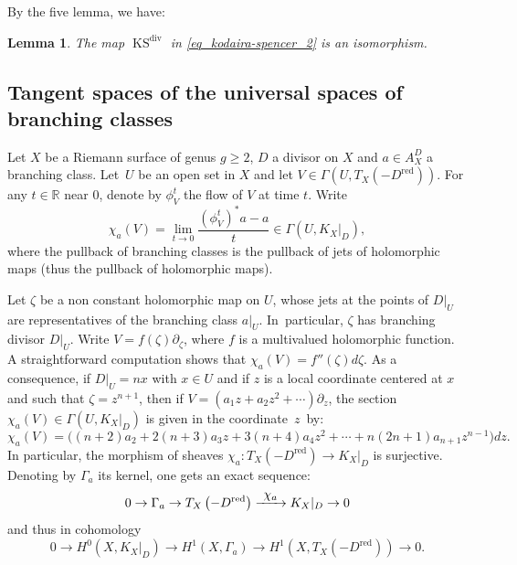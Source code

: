 \documentclass[JEP,XML,SOM,Unicode,NoEqCountersInSection,published]{cedram}
\newcommand\To[1]{\mathchoice{\xrightarrow{\textstyle\kern4pt#1\kern3pt}}{\stackrel{#1}{\longrightarrow}}{}{}}
\newcommand{\red}{\mathrm{red}}
\DeclareMathOperator{\Div}{div}
\DeclareMathOperator{\KS}{KS}
\theoremstyle{definition}
\theoremstyle{plain}
\newtheorem{lemma}[definition]{Lemma}
\begin{document}
By the five lemma, we have:

\begin{lemma}\label{lemma_KS'_iso}
The map $\KS^{\Div}$ in \eqref{eq_kodaira-spencer_2} is an isomorphism.
\end{lemma}

\subsection{Tangent spaces of the universal spaces of branching classes}\label{subsection_tangent_spaces_univ_spaces_bc}

Let $X$ be a Riemann surface of genus $g \ge 2$, $D$ a divisor on $X$ and $a \in A_X^D$ a branching class.
Let~$U$ be an open set in $X$ and let $V \in\Gamma(U, T_X(-D^{\red}))$.
For any $t \in \mathbb R$ near $0$, denote by $\phi^t_V$ the flow of $V$ at time $t$.
Write\vspace*{-3pt}
\[
\chi_{a}(V) = \lim_{t \to 0} \frac{(\phi^t_V)^*a - a}t \in \Gamma(U, K_X|_D),
\]
where the pullback of branching classes is the pullback of jets of holomorphic maps (thus the pullback of holomorphic maps).

Let $\zeta$ be a non constant holomorphic map on $U$, whose jets at the points of $D|_U$ are representatives of the branching class $a|_U$. In~particular, $\zeta$ has branching divisor $D|_U$.
Write $V = f(\zeta)\partial_{\zeta}$, where $f$ is a multivalued holomorphic function.
A straightforward computation shows that $\chi_{a}(V) = f''(\zeta)d\zeta$.
As a consequence, if $D|_U = nx$ with $x \in U$ and if $z$ is a local coordinate centered at $x$ and such that $\zeta = z^{n+1}$, then if $V = (a_1z + a_2z^2 + \cdots)\partial_z$, the section $\chi_{a}(V) \in \Gamma(U, K_X|_D)$ is given in the coordinate~$z$~by:
\begin{equation}\label{eq_formule_derivee_classe}
\chi_{a}(V) = \bigl((n+2)a_2 + 2(n+3)a_3z + 3(n+4)a_4z^2 + \cdots + n(2n+1)a_{n+1}z^{n-1}\bigr)dz.
\end{equation}
In particular, the morphism of sheaves $\chi_{a}: T_X(-D^{\red}) \to K_X|_D$ is surjective.
Denoting by $\Gamma_{a}$ its kernel, one gets an exact sequence:
\begin{equation}\label{definition_gamma_alpha}
0 \to \Gamma_{a} \to T_X\left(-D^{\red}\right) \To{\chi_a} K_X|_D \to 0
\end{equation}
and thus in cohomology
\begin{equation}\label{eq_exact_cohom_classes}
0 \to H^0(X, K_X|_D) \to H^1(X, \Gamma_{a}) \to H^1\left(X, T_X\left(-D^{\red}\right)\right) \to 0.
\end{equation}
\end{document}
